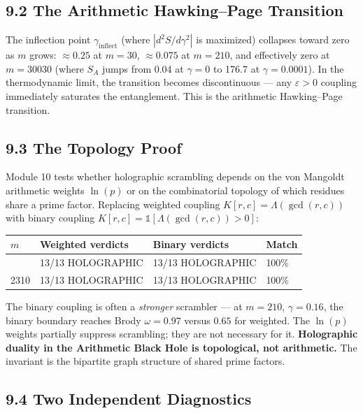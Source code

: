 \documentclass[
  11pt,
]{article}
\newcounter{none} %
\numberwithin{equation}{section}
\begin{document}
\subsection{9.2 The Arithmetic Hawking--Page
Transition}\label{the-arithmetic-hawkingpage-transition}

The inflection point \(\gamma_{\text{inflect}}\) (where
\(|d^2 S/d\gamma^2|\) is maximized) collapses toward zero as \(m\)
grows: \(\approx 0.25\) at \(m = 30\), \(\approx 0.075\) at \(m = 210\),
and effectively zero at \(m = 30030\) (where \(S_A\) jumps from 0.04 at
\(\gamma = 0\) to 176.7 at \(\gamma = 0.0001\)). In the thermodynamic
limit, the transition becomes discontinuous --- any \(\varepsilon > 0\)
coupling immediately saturates the entanglement. This is the arithmetic
Hawking--Page transition.

\subsection{9.3 The Topology Proof}\label{the-topology-proof}

Module 10 tests whether holographic scrambling depends on the von
Mangoldt arithmetic weights \(\ln(p)\) or on the combinatorial topology
of which residues share a prime factor. Replacing weighted coupling
\(K[r,c] = \Lambda(\gcd(r,c))\) with binary coupling
\(K[r,c] = \mathbb{1}[\Lambda(\gcd(r,c)) > 0]\):

{\def\LTcaptype{none} %
\begin{longtable}[]{@{}llll@{}}
\toprule\noalign{}
\(m\) & Weighted verdicts & Binary verdicts & Match \\
\midrule\noalign{}
\endhead
\bottomrule\noalign{}
\endlastfoot
210 & 13/13 HOLOGRAPHIC & 13/13 HOLOGRAPHIC & 100\% \\
2310 & 13/13 HOLOGRAPHIC & 13/13 HOLOGRAPHIC & 100\% \\
\end{longtable}
}

The binary coupling is often a \emph{stronger} scrambler --- at
\(m = 210\), \(\gamma = 0.16\), the binary boundary reaches Brody
\(\omega = 0.97\) versus \(0.65\) for weighted. The \(\ln(p)\) weights
partially suppress scrambling; they are not necessary for it.
\textbf{Holographic duality in the Arithmetic Black Hole is topological,
not arithmetic.} The invariant is the bipartite graph structure of
shared prime factors.

\subsection{9.4 Two Independent
Diagnostics}\label{two-independent-diagnostics}
\end{document}
